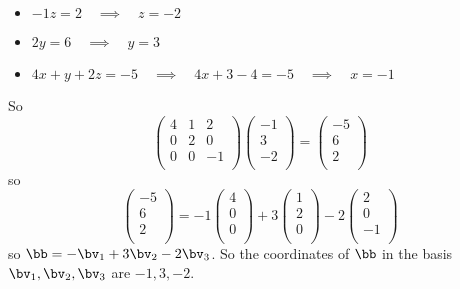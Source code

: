 \documentclass[oneside,12pt]{amsart}
\begin{document}
\begin{itemize}
\item $-1z = 2 \quad\implies\quad z = -2$
\item $2y = 6 \quad\implies\quad y = 3$
\item $4x + y + 2z = -5 \quad\implies\quad 4x + 3 -4 = -5 \quad\implies\quad x=-1$
\end{itemize}
So
$$
\begin{pmatrix}
4 & 1 & 2 \\
0 & 2 & 0 \\
0 & 0 & -1 \\
\end{pmatrix}
\begin{pmatrix}
-1 \\
3 \\
-2 \\
\end{pmatrix}
=
\begin{pmatrix}
-5 \\
6 \\
2 \\
\end{pmatrix}
$$
so
$$
\begin{pmatrix}
-5 \\
6 \\
2 \\
\end{pmatrix}
=
-1
\begin{pmatrix}
4 \\
0\\
0\\
\end{pmatrix}
+
3
\begin{pmatrix}
1 \\
2\\
0\\
\end{pmatrix}
-2
\begin{pmatrix}
2  \\
0  \\
-1 \\
\end{pmatrix}
$$
so $\bb = -\bv_1 + 3\bv_2 -2\bv_3$.
So the coordinates of $\bb$ in the basis $\bv_1,\bv_2,\bv_3$ are
$-1,3,-2$.
\end{document}
